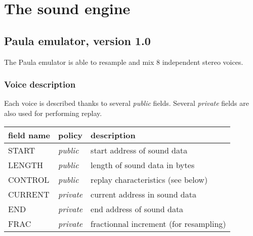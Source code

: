 \chapter{The sound engine}

\newcommand{\fname}[1]{\textsc{#1}}
\newcommand{\public}{\textit{public}}
\newcommand{\private}{\textit{private}}

\section{Paula emulator, version 1.0}

The Paula emulator is able to resample and mix 8 independent stereo
voices.

\subsection{Voice description}
Each voice is described thanks to several \public{} fields.  Several
\private{} fields are also used for performing replay.

\begin{center}
  \begin{tabular}{|l|l|l|}
    \hline
    field name & policy & description \\
    \hline
    \fname{START} & \public & start address of sound data \\
    \fname{LENGTH} & \public & length of sound data in bytes \\
    \fname{CONTROL} & \public & replay characteristics (see below)\\
    \hline
    \hline
    \fname{CURRENT} & \private & current address in sound data\\
    \fname{END} & \private & end address of sound data\\
    \fname{FRAC} & \private & fractionnal increment (for resampling)\\
    \hline
  \end{tabular}
\end{center}
